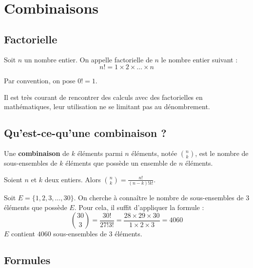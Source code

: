 	\section{Combinaisons}
	
	\subsection{Factorielle}
	
	\begin{formula}[Définition]
		Soit $n$ un nombre entier. On appelle factorielle de $n$ le nombre entier suivant :
		\[ n! = 1 \times 2 \times \dots \times n \]
	\end{formula}
	
	\begin{tip}[Convention]
		Par convention, on pose $0! = 1$.
	\end{tip}
	
	Il est très courant de rencontrer des calculs avec des factorielles en mathématiques, leur utilisation ne se limitant pas au dénombrement.
	
	\subsection{Qu'est-ce-qu'une combinaison ?}
	
	\begin{formula}[Définition]
		Une \textbf{combinaison} de $k$ éléments parmi $n$ éléments, notée $\binom{n}{k}$, est le nombre de sous-ensembles de $k$ éléments que possède un ensemble de $n$ éléments.
	\end{formula}
	
	\begin{formula}
		Soient $n$ et $k$ deux entiers. Alors $\binom{n}{k} = \frac{n!}{(n-k)!k!}$.
	\end{formula}
	
	\begin{tip}[Exemple]
		Soit $E = \{1, 2, 3, \dots, 30 \}$. On cherche à connaître le nombre de sous-ensembles de $3$ éléments que possède $E$. Pour cela, il suffit d'appliquer la formule :
		\[ \binom{30}{3} = \frac{30!}{27!3!} = \frac{28 \times 29 \times 30}{1 \times 2 \times 3} = 4060 \]
		$E$ contient $4060$ sous-ensembles de $3$ éléments.
	\end{tip}
	
	\subsection{Formules}
	
